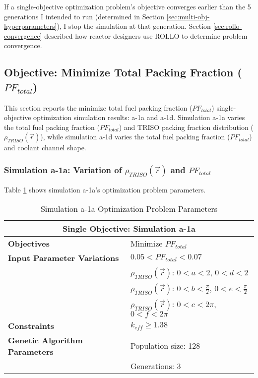 If a single-objective optimization problem's objective converges earlier than the 
5 generations I intended to run (determined in Section 
\ref{sec:multi-obj-hyperparameters}), I stop the simulation at that generation. 
Section \ref{sec:rollo-convergence} described how reactor designers use 
\gls{ROLLO} to determine problem convergence. 

\subsection{Objective: Minimize Total Packing Fraction ($PF_{total}$)}
\label{sec:assem-1-obj-pf}
This section reports the minimize total fuel packing fraction 
($PF_{total}$) single-objective optimization simulation results: a-1a and a-1d. 
Simulation a-1a varies the total fuel packing fraction ($PF_{total}$) and \gls{TRISO} 
packing fraction distribution ($\rho_{TRISO}(\vec{r})$), while simulation a-1d varies 
the total fuel packing fraction ($PF_{total}$) and coolant channel shape. 

\subsubsection{Simulation a-1a: Variation of $\rho_{TRISO}(\vec{r})$ and $PF_{total}$}
Table \ref{tab:simulationa1a} shows simulation a-1a's optimization problem parameters. 
\begin{table}[htbp!]
    \centering
    \onehalfspacing
    \caption{Simulation a-1a Optimization Problem Parameters}
	\label{tab:simulationa1a}
    \footnotesize
    \begin{tabular}{l|p{5.3cm}}
    \hline 
    \multicolumn{2}{c}{\textbf{Single Objective: Simulation a-1a}} \\
    \hline 
    \textbf{Objectives} & Minimize $PF_{total}$ \\
    \hline 
    \textbf{Input Parameter Variations} & $0.05<PF_{total}<0.07$ \\
    & $\rho_{TRISO}(\vec{r})$: $0<a<2$, $0<d<2$\\
    & $\rho_{TRISO}(\vec{r})$: $0<b<\frac{\pi}{2}$, $0<e<\frac{\pi}{2}$\\
    & $\rho_{TRISO}(\vec{r})$: $0<c<2\pi$, $0<f<2\pi$\\
    \hline
    \textbf{Constraints} & $k_{eff} \geq 1.38$\\ 
    \hline 
    \textbf{Genetic Algorithm Parameters} & Population size: 128 \\
    & Generations: 3 \\
    \hline
    \end{tabular}
\end{table}

